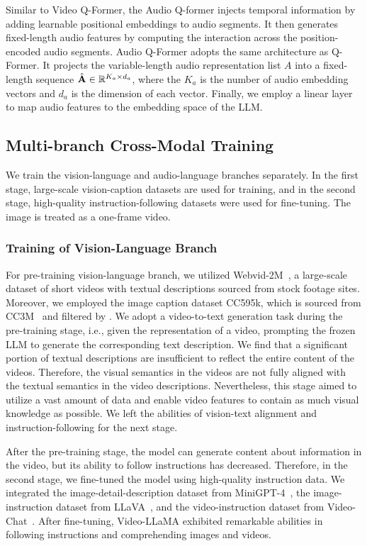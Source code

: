 Similar to Video Q-Former, the Audio Q-former injects temporal information by adding learnable positional embeddings to audio segments. It then generates fixed-length audio features by computing the interaction across the position-encoded audio segments.  Audio Q-Former adopts the same architecture as Q-Former. It projects the variable-length audio representation list $A$ into a fixed-length sequence $\hat{\mathrm{\bf A}} \in \mathbb{R} ^ {K_a \times d_a}$, where the $K_a$ is the number of audio embedding vectors and $d_a$ is the dimension of each vector. Finally, we employ a linear layer to map audio features to the embedding space of the LLM.

\subsection{Multi-branch Cross-Modal Training}
We train the vision-language and audio-language branches separately. In the first stage, large-scale vision-caption datasets are used for training, and in the second stage, high-quality instruction-following datasets were used for fine-tuning. The image is treated as a one-frame video.

\subsubsection{Training of Vision-Language Branch}
For pre-training vision-language branch, we utilized Webvid-2M~\citep{Bain21}, a large-scale dataset of short videos with textual descriptions sourced from stock footage sites. Moreover, we employed the image caption dataset CC595k, which is sourced from CC3M~\citep{sharma-etal-2018-conceptual} and filtered by \citet{liu2023visualit}. We adopt a video-to-text generation task during the pre-training stage, i.e., given the representation of a video, prompting the frozen LLM to generate the corresponding text description. We find that a significant portion of textual descriptions are insufficient to reflect the entire content of the videos. Therefore, the visual semantics in the videos are not fully aligned with the textual semantics in the video descriptions. Nevertheless, this stage aimed to utilize a vast amount of data and enable video features to contain as much visual knowledge as possible. We left the abilities of vision-text alignment and instruction-following for the next stage.

After the  pre-training stage, the model can generate content about information in the video, but its ability to follow instructions has decreased. Therefore, in the second stage, we fine-tuned the model using high-quality instruction data. We integrated the image-detail-description dataset from MiniGPT-4~\citep{zhu2023minigpt}, the image-instruction dataset from LLaVA~\citep{liu2023visualit}, and the video-instruction dataset from Video-Chat~\citep{li2023videochatcv}. After fine-tuning, Video-LLaMA exhibited remarkable abilities in following instructions and comprehending images and videos. 

